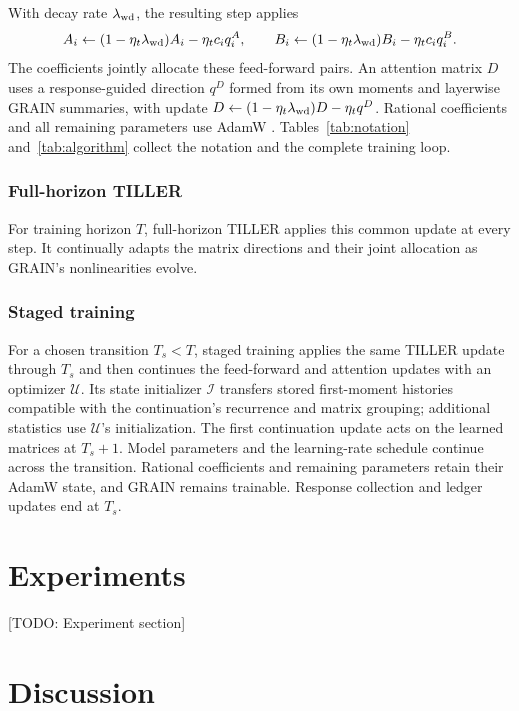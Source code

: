 \documentclass{article}
\begin{document}
With decay rate $\lambda_{\rm wd}$, the resulting step applies
\[
 A_i\leftarrow(1-\eta_t\lambda_{\rm wd})A_i-\eta_tc_iq_i^A,
 \qquad
 B_i\leftarrow(1-\eta_t\lambda_{\rm wd})B_i-\eta_tc_iq_i^B.
\]
The coefficients jointly allocate these feed-forward pairs.
An attention matrix $D$ uses a response-guided direction $q^D$ formed
from its own moments and layerwise GRAIN summaries, with update
$D\leftarrow(1-\eta_t\lambda_{\rm wd})D-\eta_tq^D$.
Rational coefficients and all remaining parameters use AdamW
\citep{loshchilov2019decoupled}.
Tables~\ref{tab:notation} and~\ref{tab:algorithm} collect the notation
and the complete training loop.

\subsubsection{Full-horizon TILLER}

For training horizon $T$, full-horizon TILLER applies this common
update at every step. It continually adapts the matrix directions
and their joint allocation as GRAIN's nonlinearities evolve.

\subsubsection{Staged training}

For a chosen transition $T_s<T$, staged training applies the same
TILLER update through $T_s$ and then continues the feed-forward and
attention updates with an optimizer $\mathcal U$.
Its state initializer $\mathcal I$ transfers stored first-moment
histories compatible with the continuation's recurrence and matrix
grouping; additional statistics use $\mathcal U$'s initialization.
The first continuation update acts on the learned matrices at $T_s+1$.
Model parameters and the learning-rate schedule continue across
the transition. Rational coefficients and remaining parameters retain
their AdamW state, and GRAIN remains trainable.
Response collection and ledger updates end at $T_s$.

\section{Experiments}

[TODO: Experiment section]

\section{Discussion}
\end{document}
